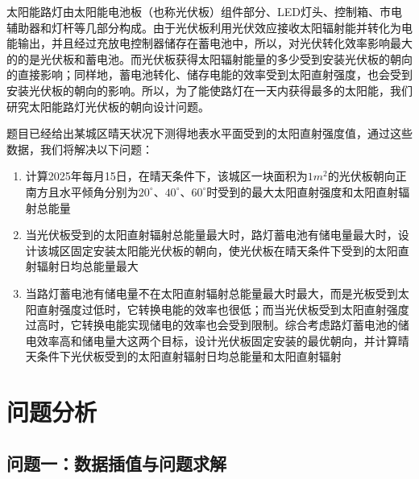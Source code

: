 \documentclass[withoutpreface,bwprint]{cumcmthesis} %
\begin{document}
太阳能路灯由太阳能电池板（也称光伏板）组件部分、LED灯头、控制箱、市电辅助器和灯杆等几部分构成。由于光伏板利用光伏效应接收太阳辐射能并转化为电能输出，并且经过充放电控制器储存在蓄电池中，所以，对光伏转化效率影响最大的的是光伏板和蓄电池。而光伏板获得太阳辐射能量的多少受到安装光伏板的朝向的直接影响；同样地，蓄电池转化、储存电能的效率受到太阳直射强度，也会受到安装光伏板的朝向的影响。所以，为了能使路灯在一天内获得最多的太阳能，我们研究太阳能路灯光伏板的朝向设计问题。

题目已经给出某城区晴天状况下测得地表水平面受到的太阳直射强度值，通过这些数据，我们将解决以下问题：

\begin{enumerate}
	\item 计算2025年每月15日，在晴天条件下，该城区一块面积为$1m^{2}$的光伏板朝向正南方且水平倾角分别为$20^{\circ}$、$40^{\circ}$、$60^{\circ}$时受到的最大太阳直射强度和太阳直射辐射总能量
	
	
	\item 当光伏板受到的太阳直射辐射总能量最大时，路灯蓄电池有储电量最大时，设计该城区固定安装太阳能光伏板的朝向，使光伏板在晴天条件下受到的太阳直射辐射日均总能量最大
	
	
	\item 当路灯蓄电池有储电量不在太阳直射辐射总能量最大时最大，而是光板受到太阳直射强度过低时，它转换电能的效率也很低；而当光伏板受到太阳直射强度过高时，它转换电能实现储电的效率也会受到限制。综合考虑路灯蓄电池的储电效率高和储电量大这两个目标，设计光伏板固定安装的最优朝向，并计算晴天条件下光伏板受到的太阳直射辐射日均总能量和太阳直射辐射
	
\end{enumerate}






















\section{问题分析}



\subsection{问题一：数据插值与问题求解}
\end{document}
